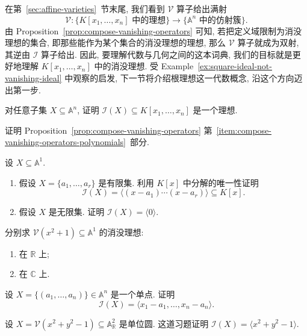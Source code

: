 在第~\ref{sec:affine-varieties}~节末尾, 我们看到 $\mathcal{V}$ 算子给出满射
\[
  \mathcal{V}:\{K[x_{1},\ldots,x_{n}]\text{ 中的理想}\}
    \longrightarrow\{\mathbb{A}^{n}\text{ 中的仿射簇}\}.
\]
由 Proposition~\ref{prop:compose-vanishing-operators} 可知, 若把定义域限制为消没理想的集合, 即那些能作为某个集合的消没理想的理想, 那么 $\mathcal{V}$ 算子就成为双射, 其逆由 $\mathcal{I}$ 算子给出. 因此, 要理解代数与几何之间的这本词典, 我们的目标就是更好地理解 $K[x_{1},\ldots,x_{n}]$ 中的消没理想. 受 Example~\ref{ex:square-ideal-not-vanishing-ideal} 中观察的启发, 下一节将介绍根理想这一代数概念, 沿这个方向迈出第一步.

\BookExerciseHeading
\begin{BookExercises}
  \item\label{ex:vanishing-set-of-polynomials-is-ideal} 对任意子集 $X\subseteq\mathbb{A}^{n}$, 证明 $\mathcal{I}(X)\subseteq K[x_{1},\ldots,x_{n}]$ 是一个理想.
  \item\label{ex:prove-second-composition-inclusion} 证明 Proposition~\ref{prop:compose-vanishing-operators} 第~\ref{item:compose-vanishing-operators-polynomials}~部分.
  \item\label{ex:vanishing-ideals-of-subsets-of-line} 设 $X\subseteq\mathbb{A}^{1}$.
    \begin{enumerate}[label=(\alph*)]
      \item 假设 $X=\{a_{1},\ldots,a_{r}\}$ 是有限集. 利用 $K[x]$ 中分解的唯一性证明
        \[
          \mathcal{I}(X)=\langle(x-a_{1})\cdots(x-a_{r})\rangle\subseteq K[x].
        \]
      \item 假设 $X$ 是无限集. 证明 $\mathcal{I}(X)=\langle0\rangle$.
    \end{enumerate}
  \item\label{ex:vanishing-ideal-quadratic-real-complex} 分别求 $\mathcal{V}(x^{2}+1)\subseteq\mathbb{A}^{1}$ 的消没理想:
    \begin{enumerate}[label=(\alph*)]
      \item 在 $\mathbb{R}$ 上;
      \item 在 $\mathbb{C}$ 上.
    \end{enumerate}
  \item\label{ex:vanishing-ideal-of-a-single-point} 设 $X=\{(a_{1},\ldots,a_{n})\}\in\mathbb{A}^{n}$ 是一个单点. 证明
    \[
      \mathcal{I}(X)=\langle x_{1}-a_{1},\ldots,x_{n}-a_{n}\rangle.
    \]
  \item\label{ex:vanishing-ideal-of-real-unit-circle} 设 $X=\mathcal{V}(x^{2}+y^{2}-1)\subseteq\mathbb{A}^{2}_{\mathbb{R}}$ 是单位圆. 这道习题证明 $\mathcal{I}(X)=\langle x^{2}+y^{2}-1\rangle$.

\end{BookExercises}
